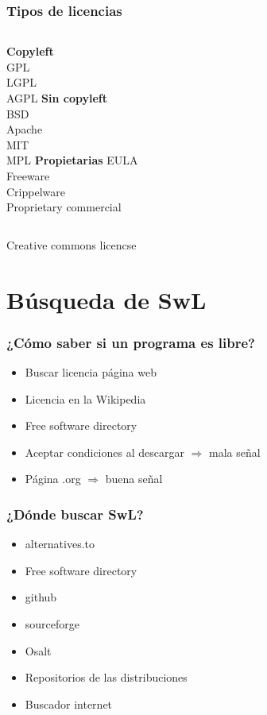 \documentclass{beamer}
\begin{document}
\begin{frame}\frametitle{Tipos de licencias}
    \begin{columns}[c]
    \textbf{Copyleft} \\
    GPL \\ LGPL \\ AGPL
    \textbf{Sin copyleft} \\
    BSD \\ Apache \\ MIT \\ MPL
    \textbf{Propietarias}
    EULA \\ Freeware \\ Crippelware \\ Proprietary commercial
    \end{columns}
    \begin{center}
        Creative commons licencse
    \end{center}
\end{frame}

\section{Búsqueda de SwL}

\begin{frame}\frametitle{¿Cómo saber si un programa es libre?} \pause
    \begin{itemize}
        \item Buscar licencia página web \pause
        \item Licencia en la Wikipedia \pause
        \item Free software directory \pause
        \item Aceptar condiciones al descargar $\Rightarrow$ mala señal \pause
        \item Página .org $\Rightarrow$ buena señal
    \end{itemize}
\end{frame}

\begin{frame}\frametitle{¿Dónde buscar SwL?}
    \begin{itemize}
        \item alternatives.to
        \item Free software directory
        \item github
        \item sourceforge
        \item Osalt
        \item Repositorios de las distribuciones
        \item Buscador internet
    \end{itemize}
\end{frame}
\end{document}
